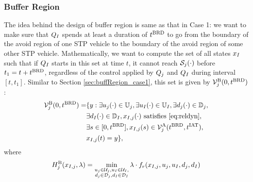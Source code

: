 \subsubsection{Buffer Region} \label{sec:buffRegion_case2}
The idea behind the design of buffer region is same as that in Case 1: we want to make sure that $Q_{I}$ spends at least a duration of $t^\text{BRD}$ to go from the boundary of the avoid region of one STP vehicle to the boundary of the avoid region of some other STP vehicle. Mathematically, we want to compute the set of all states $x_{I}$ such that if $Q_{I}$ starts in this set at time $t$, it cannot reach $\mathcal{S}_j(\cdot)$ before $t_1 = t + t^\text{BRD}$, regardless of the control applied by $Q_j$ and $Q_{I}$ during interval $[t, t_1]$. Similar to Section \ref{sec:buffRegion_case1}, this set is given by $\mathcal{V}^{\text{B}}_{j}(0, t^\text{BRD})$: 
\begin{equation} \label{eqn:buffBRS_case2}
\begin{aligned}
\brs^{\text{B}}_{j}(0, \brd) = & \{y: \exists \ctrl_j(\cdot) \in \cfset_j, \exists \ctrl_\intr(\cdot) \in \cfset_\intr, \exists \dstb_j(\cdot) \in \dfset_j, \\
& \exists \dstb_\intr(\cdot) \in \dfset_\intr, \state_{\intr, j}(\cdot) \text{ satisfies \eqref{eq:reldyn}},\\
& \exists s \in [0, \brd], \state_{\intr, j}(s) \in \brs^{\text{A}}_{j}(\brd, \iat),\\
& \state_{\intr, j}(t) = y\},
\end{aligned}
\end{equation}
where 
\begin{equation}
H^{\text{B}}_{j}(x_{I, j}, \lambda) = \min_{\substack{u_j \in \mathcal{U}_j, u_I \in \mathcal{U}_I, \\ d_j \in \mathcal{D}_j, d_I \in \mathcal{D}_I}} \lambda \cdot f_r(x_{I, j}, u_j, u_I, d_j, d_I)
\end{equation}

